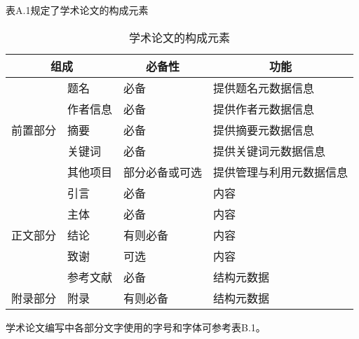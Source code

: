 
表A.1规定了学术论文的构成元素

\begin{table}[!htbp]
\centering
\caption{学术论文的构成元素}
    \begin{tabularx}{\linewidth}{|p{2.3cm}|p{3cm}|p{3cm}|X|}
    \hline
 \multicolumn{2}{|c|}{  组成 }         & \multicolumn{1}{c|}{必备性}   & \multicolumn{1}{c|}{功能} \\
    \hline
      & 题名    & 必备    & 提供题名元数据信息 \\
    \cline{2-4}
          & 作者信息  & 必备    & 提供作者元数据信息 \\
   \cline{2-4}
   \multicolumn{1}{|c|}{前置部分}        & 摘要    & 必备    & 提供摘要元数据信息 \\
    \cline{2-4}
          & 关键词   & 必备    & 提供关键词元数据信息 \\
\cline{2-4}
          & 其他项目  & 部分必备或可选 & 提供管理与利用元数据信息 \\
    \hline
    & 引言    & 必备    & 内容 \\
   \cline{2-4}
          & 主体    & 必备    & 内容 \\
 \cline{2-4}
     \multicolumn{1}{|c|}{正文部分}      & 结论    & 有则必备  & 内容 \\
  \cline{2-4}
          & 致谢    & 可选    & 内容 \\
\cline{2-4}
          & 参考文献  & 必备    & 结构元数据 \\
    \hline
    附录部分  & 附录    & 有则必备  & 结构元数据 \\
    \hline
    \end{tabularx}%
\end{table}
\newpage
{}

学术论文编写中各部分文字使用的字号和字体可参考表B.1。

